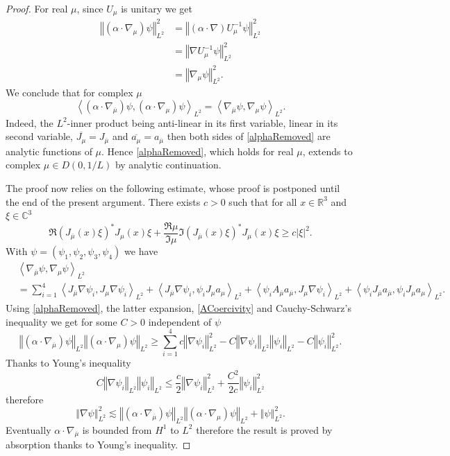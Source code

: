 \documentclass[a4paper, 12pt]{amsart}
\numberwithin{equation}{section}
\newcommand{\C}{\mathbb{C}} %
\newcommand{\R}{\mathbb{R}} %
\newcommand{\la}{\left\langle} %
\newcommand{\ra}{\right\rangle} %
\newcommand{\lv}{\left\vert} %
\newcommand{\rv}{\right\vert} %
\newcommand{\lV}{\left\Vert} %
\newcommand{\rV}{\right\Vert} %
\begin{document}
\begin{proof}
    For real $\mu$, since $U_\mu$ is unitary we get
    \begin{align*}
        \lV(\alpha\cdot\nabla_\mu)\psi\rV_{L^2}^2&=\lV(\alpha\cdot\nabla)U_\mu^{-1}\psi\rV_{L^2}^2\\
        &=\lV\nabla U_\mu^{-1}\psi\rV_{L^2}^2\\
        &=\lV\nabla_\mu\psi\rV_{L^2}^2.
    \end{align*}
    We conclude that for complex $\mu$
    \begin{equation}\label{alphaRemoved}
        \la(\alpha\cdot\nabla_{\overline{\mu}})\psi,(\alpha\cdot\nabla_\mu)\psi\ra_{L^2}=\la \nabla_{\overline{\mu}}\psi,\nabla_\mu\psi\ra_{L^2}.
    \end{equation}
    Indeed, the $L^2$-inner product being anti-linear in its first variable, linear in its second variable, $\overline{J_\mu}=J_{\overline{\mu}}$ and $\overline{a_\mu}=a_{\overline{\mu}}$ then both sides of \eqref{alphaRemoved} are analytic functions of $\mu$. Hence \eqref{alphaRemoved}, which holds for real $\mu$, extends to complex $\mu\in D(0,1/L)$ by analytic continuation. 
    
    The proof now relies on the following estimate, whose proof is postponed until the end of the present argument. There exists $c>0$ such that for all $x\in\R^3$ and $\xi\in\C^3$ 
    \begin{equation}\label{ACoercivity}
        \Re(J_{\overline{\mu}}(x)\xi)^*J_\mu(x)\xi+\frac{\Re\mu}{\Im\mu}\Im (J_{\overline{\mu}}(x)\xi)^* J_\mu(x)\xi\geq c\lv\xi\rv^2.
    \end{equation} 
    With $\psi=(\psi_1,\psi_2,\psi_3,\psi_4)$ we have 
    \begin{align*}
        &\la \nabla_{\overline{\mu}}\psi,\nabla_\mu\psi\ra_{L^2}\\
        &=\sum_{i=1}^4\la J_{\overline{\mu}}\nabla\psi_i,J_\mu \nabla\psi_i\ra_{L^2}+\la J_{\overline{\mu}}\nabla\psi_i,\psi_i J_\mu a_\mu\ra_{L^2}+\la\psi_iA_{\overline{\mu}} a_{\overline{\mu}},J_\mu \nabla\psi_i\ra_{L^2}+\la\psi_i J_{\overline{\mu}} a_{\overline{\mu}},\psi_i J_\mu a_\mu\ra_{L^2}.
    \end{align*}
    Using \eqref{alphaRemoved}, the latter expansion, \eqref{ACoercivity} and Cauchy-Schwarz's inequality we get for some $C>0$ independent of $\psi$
    \[\lV (\alpha\cdot\nabla_{\overline{\mu}})\psi\rV_{L^2}\lV (\alpha\cdot\nabla_\mu)\psi\rV_{L^2}\geq\sum_{i=1}^4c\lV\nabla\psi_i\rV_{L^2}^2-C\lV \nabla\psi_i\rV_{L^2}\lV\psi_i\rV_{L^2}-C\lV\psi_i\rV_{L^2}^2.\]
    Thanks to Young's inequality 
    \[C\lV \nabla\psi_i\rV_{L^2}\lV\psi_i\rV_{L^2}\leq \frac{c}{2}\lV \nabla\psi_i\rV_{L^2}^2+\frac{C^2}{2c}\lV\psi_i\rV_{L^2}^2\]
    therefore 
    \[\lV\nabla\psi\rV_{L^2}^2\lesssim\lV (\alpha\cdot\nabla_{\overline{\mu}})\psi\rV_{L^2}\lV (\alpha\cdot\nabla_\mu)\psi\rV_{L^2}+\lV\psi\rV_{L^2}^2.\]
    Eventually $\alpha\cdot\nabla_{\overline{\mu}}$ is bounded from $H^1$ to $L^2$ therefore the result is proved by absorption thanks to Young's inequality. 
    

\end{proof}
\end{document}
